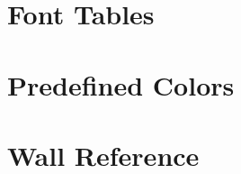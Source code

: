 \documentclass{book}
\begin{document}

\cleardoublepage



















\section{Font Tables}



\newpage

\section{Predefined Colors}

\label{colors:sec}
\mbox{}
\newpage

\label{sortedcol:sec}
\mbox{}
\newpage

\section{Wall Reference}

\label{wallref:sec}


\clearpage
{}
{}
\printindex
\end{document}
